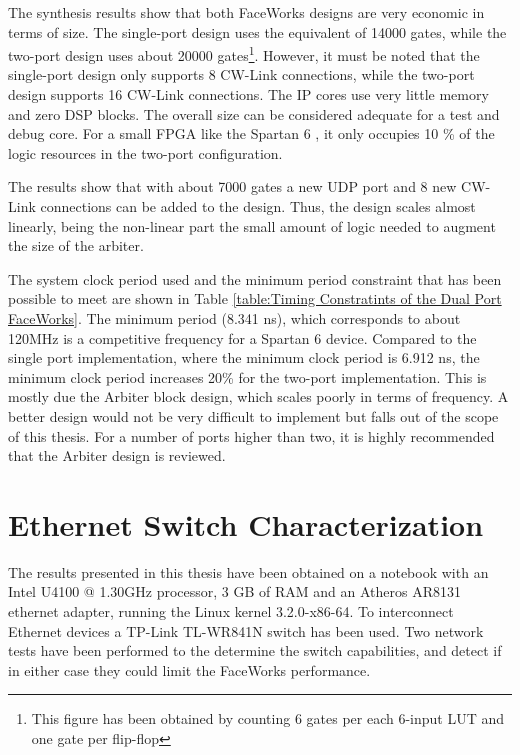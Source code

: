 \documentclass[defaultstyle,10pt,master,Helvetica]{thesis}
\begin{document}




\clearpage
The synthesis results show that both FaceWorks designs are very economic in terms of size. The single-port design uses the equivalent of 14000 gates, while the two-port design uses about 20000 gates\footnote{This figure has been obtained by counting 6 gates per each 6-input LUT and one gate per flip-flop}. However, it must be noted that the single-port design only supports 8 CW-Link connections, while the two-port design supports 16 CW-Link connections. The IP cores use very little memory and zero DSP blocks. The overall size can be considered adequate for a test and debug core. For a small FPGA like the Spartan 6 , it only occupies 10 \% of the logic resources in the two-port configuration. 

The results show that with about 7000 gates  a new UDP port and 8 new CW-Link connections can be added to the design. Thus, the design scales almost linearly, being the non-linear part the small amount of logic needed to augment the size of the arbiter.



The system clock period used and the minimum period constraint that has been possible to meet are shown in Table  \ref{table:Timing Constratints of the Dual Port FaceWorks}. The minimum period (8.341 ns), which corresponds to about 120MHz is a competitive frequency for a Spartan 6 device. Compared to the single port implementation, where the minimum clock period is 6.912 ns, the minimum clock period increases 20\% for the two-port implementation. This is mostly due the Arbiter block design, which scales poorly in terms of frequency. A better design would not be very difficult to implement but falls out of the scope of this thesis.  For a number of ports higher than two, it is highly recommended that the Arbiter design is reviewed.

\section{Ethernet Switch Characterization}

The results presented in this thesis have been obtained on a notebook with an Intel U4100 @ 1.30GHz processor, 3 GB of RAM and an Atheros AR8131 ethernet adapter, running the Linux kernel 3.2.0-x86-64. To interconnect Ethernet devices a TP-Link TL-WR841N switch has been used. Two network tests have been performed to the determine the switch capabilities, and detect if in either case they could limit the FaceWorks performance.
\end{document}
